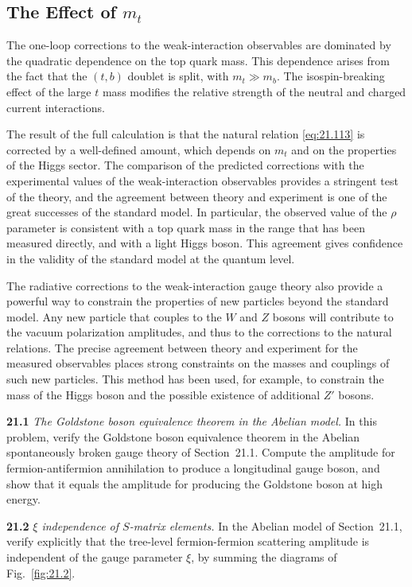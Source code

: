 \subsection{The Effect of $m_t$}

The one-loop corrections to the weak-interaction observables are dominated by
the quadratic dependence on the top quark mass.  This dependence arises from
the fact that the $(t, b)$ doublet is split, with $m_t \gg m_b$.  The
isospin-breaking effect of the large $t$ mass modifies the relative strength
of the neutral and charged current interactions.

The result of the full calculation is that the natural relation
\eqref{eq:21.113} is corrected by a well-defined amount, which depends on
$m_t$ and on the properties of the Higgs sector.  The comparison of the
predicted corrections with the experimental values of the weak-interaction
observables provides a stringent test of the theory, and the agreement
between theory and experiment is one of the great successes of the standard
model.  In particular, the observed value of the $\rho$ parameter is
consistent with a top quark mass in the range that has been measured
directly, and with a light Higgs boson.  This agreement gives confidence in
the validity of the standard model at the quantum level.

The radiative corrections to the weak-interaction gauge theory also provide
a powerful way to constrain the properties of new particles beyond the
standard model.  Any new particle that couples to the $W$ and $Z$ bosons
will contribute to the vacuum polarization amplitudes, and thus to the
corrections to the natural relations.  The precise agreement between theory
and experiment for the measured observables places strong constraints on the
masses and couplings of such new particles.  This method has been used, for
example, to constrain the mass of the Higgs boson and the possible existence
of additional $Z'$ bosons.

\problems

\textbf{21.1} \emph{The Goldstone boson equivalence theorem in the Abelian
model.}  In this problem, verify the Goldstone boson equivalence theorem in
the Abelian spontaneously broken gauge theory of Section~21.1.  Compute the
amplitude for fermion-antifermion annihilation to produce a longitudinal
gauge boson, and show that it equals the amplitude for producing the
Goldstone boson at high energy.

\textbf{21.2} \emph{$\xi$ independence of $S$-matrix elements.}  In the
Abelian model of Section~21.1, verify explicitly that the tree-level
fermion-fermion scattering amplitude is independent of the gauge parameter
$\xi$, by summing the diagrams of Fig.~\ref{fig:21.2}.

